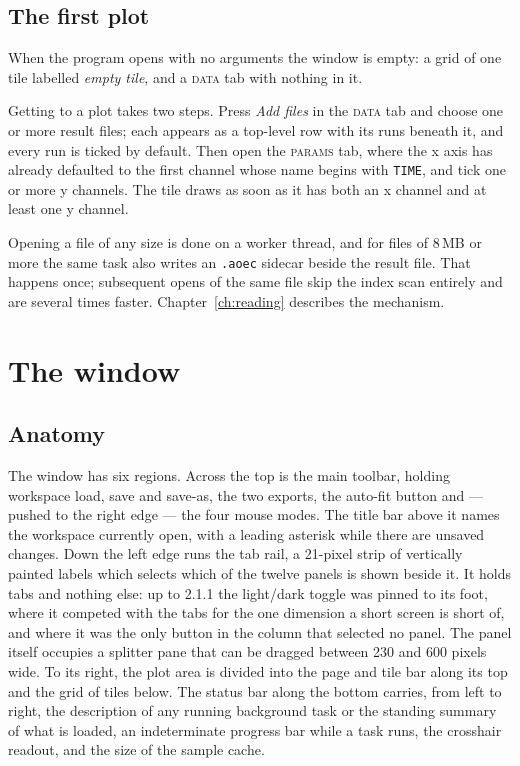 \documentclass[11pt,a4paper,oneside]{report}
\newcommand{\code}[1]{\texttt{#1}}
\newcommand{\tab}[1]{\textsc{#1}}
\begin{document}
\section{The first plot}

When the program opens with no arguments the window is empty: a grid of one tile
labelled \emph{empty tile}, and a \tab{data} tab with nothing in it.

Getting to a plot takes two steps. Press \emph{Add files} in the \tab{data} tab
and choose one or more result files; each appears as a top-level row with its
runs beneath it, and every run is ticked by default. Then open the \tab{params}
tab, where the x axis has already defaulted to the first channel whose name
begins with \code{TIME}, and tick one or more y channels. The tile draws as soon
as it has both an x channel and at least one y channel.

Opening a file of any size is done on a worker thread, and for files of 8\,MB or
more the same task also writes an \code{.aoec} sidecar beside the result file.
That happens once; subsequent opens of the same file skip the index scan
entirely and are several times faster. Chapter~\ref{ch:reading} describes the
mechanism.

\chapter{The window}

\section{Anatomy}

The window has six regions. Across the top is the main toolbar, holding
workspace load, save and save-as, the two exports, the auto-fit button and ---
pushed to the right edge --- the four mouse modes. The title bar above it names
the workspace currently open, with a leading asterisk while there are unsaved
changes. Down the left edge runs the tab rail, a 21-pixel strip of vertically
painted labels which selects which of the twelve panels is shown beside it.
It holds tabs and nothing else: up to 2.1.1 the light/dark toggle was pinned to
its foot, where it competed with the tabs for the one dimension a short screen
is short of, and where it was the only button in the column that selected no
panel. The
panel itself occupies a splitter pane that can be dragged between 230 and 600
pixels wide. To its right, the plot area is divided into the page and tile bar
along its top and the grid of tiles below. The status bar along the bottom
carries, from left to right, the description of any running background task or
the standing summary of what is loaded, an indeterminate progress bar while a
task runs, the crosshair readout, and the size of the sample cache.
\end{document}
